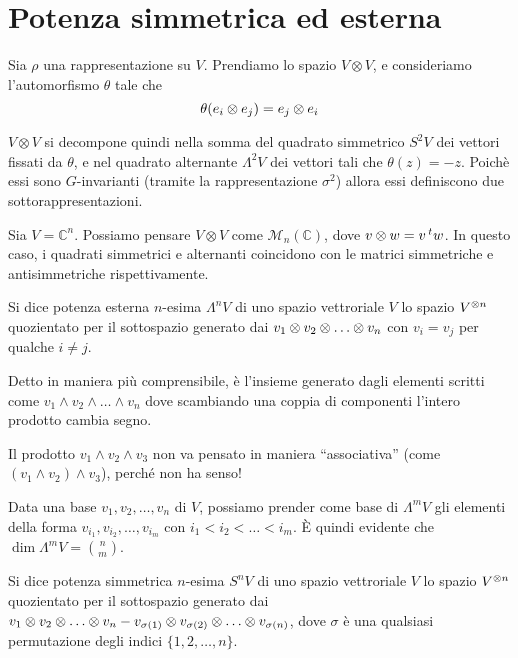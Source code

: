 \section{Potenza simmetrica ed esterna}

\begin{mydef}
  Sia $\rho$ una rappresentazione su $V$. Prendiamo lo spazio $V\otimes V$, e consideriamo l'automorfismo $\theta$ tale che 
  \[
  \theta(e_i \otimes e_j) = e_j \otimes e_i
  \]
  
  $V\otimes V$ si decompone quindi nella somma del quadrato simmetrico $S^2V$ dei vettori fissati da $\theta$, e nel quadrato alternante $\Lambda^2V$ dei vettori tali che $\theta(z) = -z$. Poichè essi sono $G$-invarianti (tramite la rappresentazione $\sigma^2$) allora essi definiscono due sottorappresentazioni.
\end{mydef}

\begin{myexample}
  Sia $V=\mathbb C^n$. Possiamo pensare $V\otimes V$ come $\mathcal M_n(\mathbb C)$, dove $v \otimes w = v\prescript{t}{}{w}$. In questo caso, i quadrati simmetrici e alternanti coincidono con le matrici simmetriche e antisimmetriche rispettivamente.
\end{myexample}

\begin{mydef}
  Si dice potenza esterna $n$-esima $\Lambda^nV$  di uno spazio vettroriale $V$ lo spazio $V^{\otimes n}$ quozientato per il sottospazio generato dai $v_1 \tensor v_2 \tensor \dots \tensor v_n$ con $v_i=v_j$ per qualche $i\ne j$.  
\end{mydef}

Detto in maniera più comprensibile, è l'insieme generato dagli elementi scritti come $v_1 \wedge v_2 \wedge \dots \wedge v_n$ dove scambiando una coppia di componenti l'intero prodotto cambia segno.

\begin{Achtung}
  Il prodotto $v_1 \wedge v_2 \wedge v_3$ non va pensato in maniera ``associativa'' (come $(v_1 \wedge v_2) \wedge v_3$), perché non ha senso!
\end{Achtung}

Data una base $v_1,v_2,\dots,v_n$ di $V$, possiamo prender come base di $\Lambda^mV$ gli elementi della forma $v_{i_1},v_{i_2},\dots,v_{i_m}$ con $i_1<i_2<\dots<i_m$. \`E quindi evidente che $\dim \Lambda^mV=\binom nm$.    
  
\begin{mydef}
  Si dice potenza simmetrica $n$-esima $S^nV$  di uno spazio vettroriale $V$ lo spazio $V^{\otimes n}$ quozientato per il sottospazio generato dai $v_1 \tensor v_2 \tensor \dots \tensor v_n - v_{\sigma(1)} \tensor v_{\sigma(2)} \tensor \dots \tensor v_{\sigma(n)}$, dove $\sigma$ è una qualsiasi permutazione degli indici $\{1,2,\dots,n\}$.  
\end{mydef}

